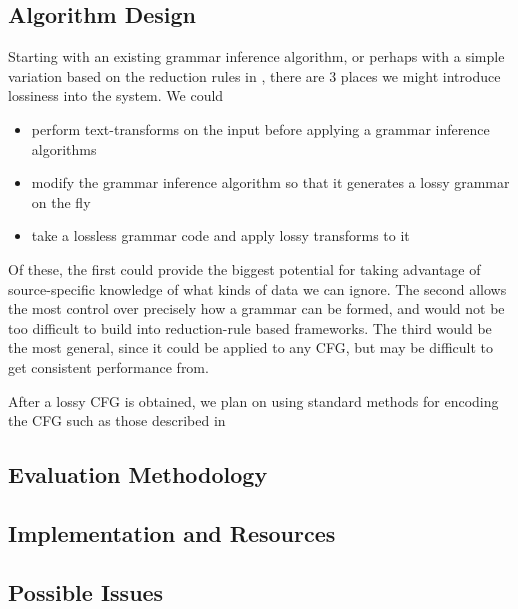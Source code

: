 \documentclass[11pt]{article}
\begin{document}
\subsection{Algorithm Design}

Starting with an existing grammar inference algorithm, or perhaps with a
simple variation based
on the reduction rules in \cite{grammarcodes}, there are 3 places we might introduce
lossiness into the system. We could
\begin{itemize}
\item perform text-transforms on the input before applying a 
      grammar inference algorithms
\item modify the grammar inference algorithm so that it generates a lossy
      grammar on the fly
\item take a lossless grammar code and apply lossy transforms to it
\end{itemize}

Of these, the first could provide the biggest potential for taking advantage of
source-specific knowledge of what kinds of data we can ignore. The second
allows the most control over precisely how a grammar can be formed, and would not
be too difficult to build into reduction-rule based frameworks. The third would
be the most general, since it could be applied to any CFG, but may be difficult
to get consistent performance from.

After a lossy CFG is obtained, we plan on using standard methods for encoding the CFG
such as those described in \cite{sequitur2}

\subsection{Evaluation Methodology}

\subsection{Implementation and Resources}

\subsection{Possible Issues}

\nocite{*}


\end{document}
